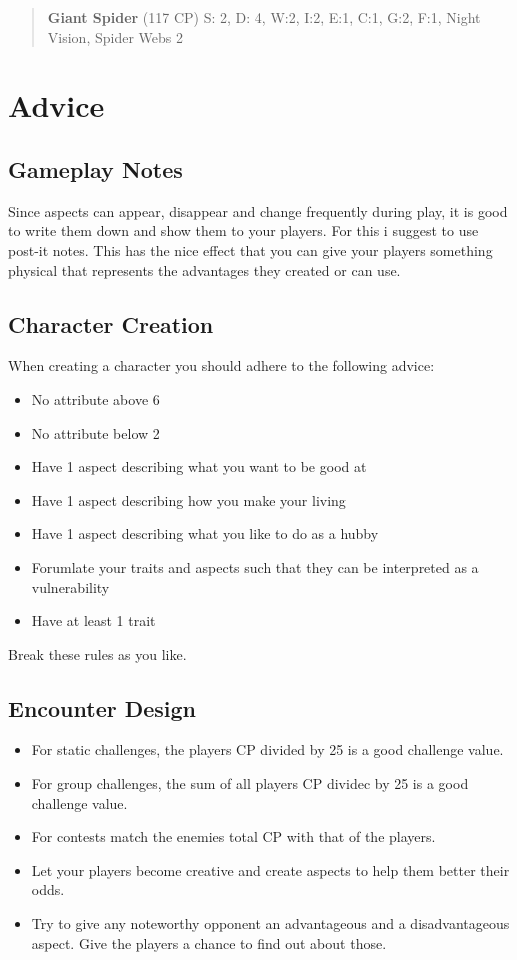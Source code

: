\documentclass[11pt]{article}
\begin{document}
{\begin{quote}
\textbf{Giant Spider} (117 CP)
S: 2, D: 4, W:2, I:2, E:1, C:1, G:2, F:1, Night Vision, Spider Webs 2
\end{quote}


\newpage

\section{Advice}
\label{sec:orgcfa11ee}
\subsection{Gameplay Notes}
\label{sec:orgda93db8}

Since aspects can appear, disappear and change frequently during play, it is good to write them down and show them to your players. For this i suggest to use post-it notes. This has the nice effect that you can give your players something physical that represents the advantages they created or can use.

\subsection{Character Creation}
\label{sec:org77b4bde}

When creating a character you should adhere to the following advice:
\begin{itemize}
\item No attribute above 6
\item No attribute below 2
\item Have 1 aspect describing what you want to be good at
\item Have 1 aspect describing how you make your living
\item Have 1 aspect describing what you like to do as a hubby
\item Forumlate your traits and aspects such that they can be interpreted as a vulnerability
\item Have at least 1 trait
\end{itemize}
Break these rules as you like.

\subsection{Encounter Design}
\label{sec:orgfd03251}

\begin{itemize}
\item For static challenges, the players CP divided by 25 is a good challenge value.
\item For group challenges, the sum of all players CP dividec by 25 is a good challenge value.
\item For contests match the enemies total CP with that of the players.
\item Let your players become creative and create aspects to help them better their odds.
\item Try to give any noteworthy opponent an advantageous and a disadvantageous aspect. Give the players a chance to find out about those.
\end{itemize}

}
\end{document}

